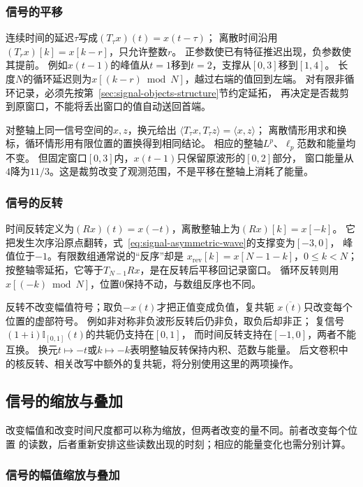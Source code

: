 \subsubsection{信号的平移}

连续时间的延迟$\tau$写成$(T_\tau x)(t)=x(t-\tau)$；
离散时间沿用$(T_rx)[k]=x[k-r]$，只允许整数$r$。
正参数使已有特征推迟出现，负参数使其提前。
例如$x(t-1)$的峰值从$t=1$移到$t=2$，支撑从$[0,3]$移到$[1,4]$。
长度$N$的循环延迟则为$x[(k-r)\bmod N]$，越过右端的值回到左端。
对有限非循环记录，必须先按第~\ref{sec:signal-objects-structure}节约定延拓，
再决定是否裁剪到原窗口，不能将丢出窗口的值自动送回首端。

对整轴上同一信号空间的$x,z$，换元给出
$\langle T_\tau x,T_\tau z\rangle=\langle x,z\rangle$；
离散情形用求和换标，循环情形用有限位置的置换得到相同结论。
相应的整轴$L^p$、$\ell_p$范数和能量均不变。
但固定窗口$[0,3]$内，$x(t-1)$只保留原波形的$[0,2]$部分，
窗口能量从$4$降为$11/3$。这是裁剪改变了观测范围，不是平移在整轴上消耗了能量。

\subsubsection{信号的反转}

时间反转定义为$(Rx)(t)=x(-t)$，离散整轴上为$(Rx)[k]=x[-k]$。
它把发生次序沿原点翻转，式~\eqref{eq:signal-asymmetric-wave}的支撑变为$[-3,0]$，
峰值位于$-1$。有限数组通常说的“反序”却是
$x_{\mathrm{rev}}[k]=x[N-1-k]$，$0\leq k<N$；
按整轴零延拓，它等于$T_{N-1}Rx$，是在反转后平移回记录窗口。
循环反转则用$x[(-k)\bmod N]$，位置$0$保持不动，与数组反序也不同。

反转不改变幅值符号；取负$-x(t)$才把正值变成负值，复共轭
$\overline{x(t)}$只改变每个位置的虚部符号。
例如非对称非负波形反转后仍非负，取负后却非正；
复信号$(1+\mathrm i)\mathbb I_{[0,1]}(t)$的共轭仍支持在$[0,1]$，
而时间反转支持在$[-1,0]$，两者不能互换。
换元$t\mapsto-t$或$k\mapsto-k$表明整轴反转保持内积、范数与能量。
后文卷积中的核反转、相关改写中额外的复共轭，将分别使用这里的两项操作。

\subsection{信号的缩放与叠加}

改变幅值和改变时间尺度都可以称为缩放，但两者改变的量不同。前者改变每个位置
的读数，后者重新安排这些读数出现的时刻；相应的能量变化也需分别计算。

\subsubsection{信号的幅值缩放与叠加}

